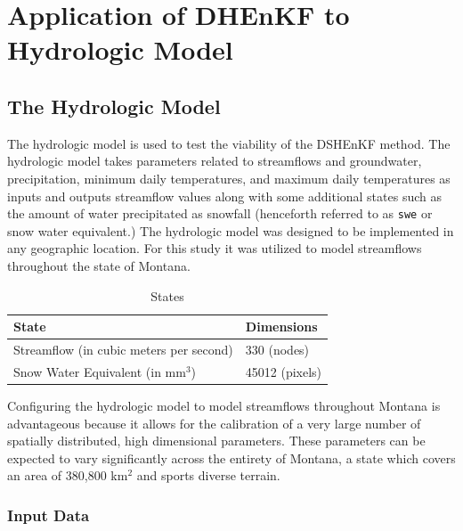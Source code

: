 \chapter{Application of DHEnKF to Hydrologic Model}

\section{The Hydrologic Model}

The hydrologic model is used to test the viability of the DSHEnKF method. The hydrologic model takes parameters related to streamflows and groundwater, precipitation, minimum daily temperatures, and maximum daily temperatures as inputs and outputs streamflow values along with some additional states such as the amount of water precipitated as snowfall (henceforth referred to as \texttt{swe} or snow water equivalent.) The hydrologic model was designed to be implemented in any geographic location. For this study it was utilized to model streamflows throughout the state of Montana.

\begin{table}[]
\caption{States} 
\begin{tabular}{ll}
State                              & Dimensions  \\ \hline
Streamflow (in cubic meters per second)               & 330 (nodes) \\
Snow Water Equivalent  (in mm$^{3}$) & 45012 (pixels)
\end{tabular}
\label{tab:states}
\end{table}

Configuring the hydrologic model to model streamflows throughout Montana is advantageous because it allows for the calibration of a very large number of spatially distributed, high dimensional parameters. These parameters can be expected to vary significantly across the entirety of Montana, a state which covers an area of 380,800 km$^{2}$ and sports diverse terrain.

\subsection{Input Data}

